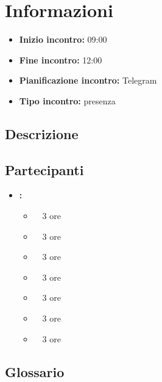 \section{Informazioni}
\begin{itemize}
	\item \textbf{Inizio incontro:} 09:00
	\item \textbf{Fine incontro:} 12:00
	\item \textbf{Pianificazione incontro:} Telegram
	\item \textbf{Tipo incontro:} presenza
\end{itemize}

\subsection{Descrizione}
\DocDescription

\subsection{Partecipanti}

\begin{itemize}
	\item \textbf{\GroupName:}
	\begin{itemize}
		\item \riccardo \ \rightarrow\ 3 ore
		\item \raul \ \rightarrow\ 3 ore
		\item \marco \ \rightarrow\ 3 ore
		\item \martina \ \rightarrow\ 3 ore
		\item \tommaso \ \rightarrow\ 3 ore
		\item \sebastiano \ \rightarrow\ 3 ore
		\item \mattia \ \rightarrow\ 3 ore
	\end{itemize}
\end{itemize}

\subsection{Glossario}
\GlossarioIntroduzione

\clearpage
